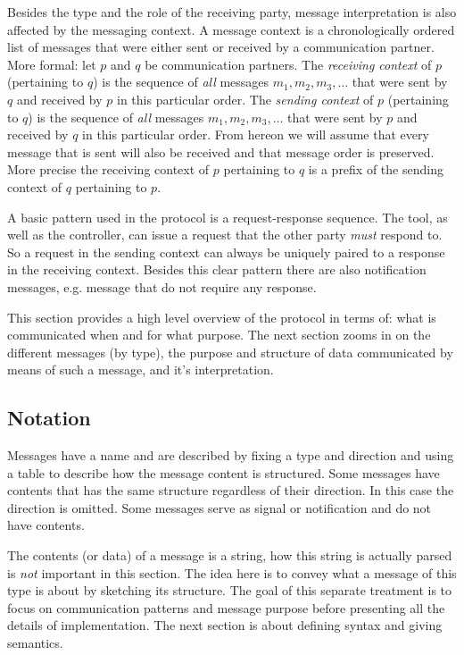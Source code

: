 \documentclass{article}
\begin{document}
  Besides the type and the role of the receiving party, message interpretation
  is also affected by the messaging context. A message context is a chronologically
  ordered list of messages that were either sent or received by a communication
  partner.  More formal: let $p$ and $q$ be communication partners. The
  \textit{receiving context} of $p$ (pertaining to $q$) is the sequence of
  \emph{all} messages $m_{1}, m_{2}, m_{3}, \ldots$ that were sent by $q$ and
  received by $p$ in this particular order.  The \textit{sending context} of
  $p$ (pertaining to $q$) is the sequence of \emph{all} messages $m_{1}, m_{2},
  m_{3}, \ldots$ that were sent by $p$ and received by $q$ in this particular
  order. From hereon we will assume that every message that is sent will also
  be received and that message order is preserved. More precise the receiving
  context of $p$ pertaining to $q$ is a prefix of the sending context of $q$
  pertaining to $p$.

  A basic pattern used in the protocol is a request-response sequence. The
  tool, as well as the controller, can issue a request that the other party
  \emph{must} respond to. So a request in the sending context can always be
  uniquely paired to a response in the receiving context. Besides this clear
  pattern there are also notification messages, e.g. message that do not
  require any response.

  This section provides a high level overview of the protocol in terms of: what
  is communicated when and for what purpose. The next section zooms in on the
  different messages (by type), the purpose and structure of data communicated
  by means of such a message, and it's interpretation.

  \subsection{Notation}

   Messages have a name and are described by fixing a type and direction and
   using a table to describe how the message content is structured. Some
   messages have contents that has the same structure regardless of their
   direction. In this case the direction is omitted. Some messages serve as
   signal or notification and do not have contents.
   
   The contents (or data) of a message is a string, how this string is actually
   parsed is \emph{not} important in this section. The idea here is to convey
   what a message of this type is about by sketching its structure. The goal of
   this separate treatment is to focus on communication patterns and message
   purpose before presenting all the details of implementation.  The next
   section is about defining syntax and giving semantics.
   
\end{document}
